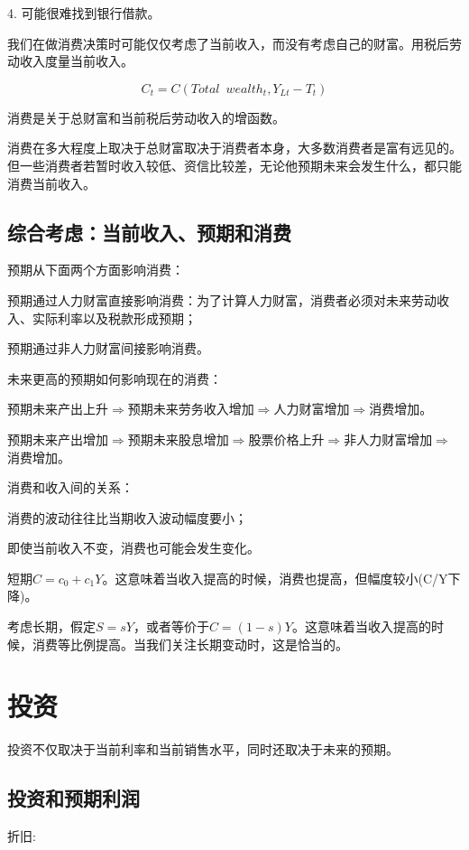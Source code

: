 \documentclass{article}
\begin{document}
4. 可能很难找到银行借款。

我们在做消费决策时可能仅仅考虑了当前收入，而没有考虑自己的财富。用税后劳动收入度量当前收入。

\[
C_t=C(Total\enspace wealth_t,Y_{Lt}-T_t)
\]

消费是关于总财富和当前税后劳动收入的增函数。

消费在多大程度上取决于总财富取决于消费者本身，大多数消费者是富有远见的。但一些消费者若暂时收入较低、资信比较差，无论他预期未来会发生什么，都只能消费当前收入。

\subsection{综合考虑：当前收入、预期和消费}

预期从下面两个方面影响消费：

预期通过人力财富直接影响消费：为了计算人力财富，消费者必须对未来劳动收入、实际利率以及税款形成预期；

预期通过非人力财富间接影响消费。

未来更高的预期如何影响现在的消费：

预期未来产出上升$ \Rightarrow $预期未来劳务收入增加$ \Rightarrow $人力财富增加$ \Rightarrow $消费增加。

预期未来产出增加$ \Rightarrow $预期未来股息增加$ \Rightarrow $股票价格上升$ \Rightarrow $非人力财富增加$ \Rightarrow $消费增加。


消费和收入间的关系：

消费的波动往往比当期收入波动幅度要小；

即使当前收入不变，消费也可能会发生变化。

短期$ C=c_0+c_1Y $。这意味着当收入提高的时候，消费也提高，但幅度较小(C/Y下降)。

考虑长期，假定$ S=sY $，或者等价于$ C=(1-s)Y $。这意味着当收入提高的时候，消费等比例提高。当我们关注长期变动时，这是恰当的。

\section{投资}

投资不仅取决于当前利率和当前销售水平，同时还取决于未来的预期。

\subsection{投资和预期利润}

折旧:
\end{document}
